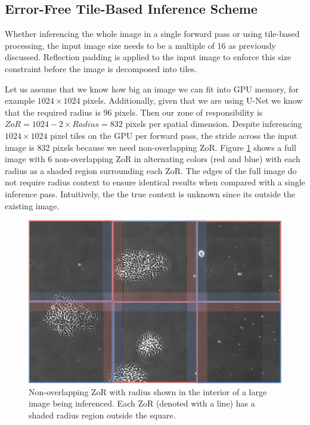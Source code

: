 \documentclass[letterpaper]{article} %
\begin{document}
\subsection{Error-Free Tile-Based Inference Scheme}

Whether inferencing the whole image in a single forward pass or using tile-based processing, the input image size needs to be a multiple of 16 as previously discussed. Reflection padding is applied to the input image to enforce this size constraint before the image is decomposed into tiles. 

Let us assume that we know how big an image we can fit into GPU memory, for example $1024 \times 1024$ pixels. Additionally, given that we are using U-Net we know that the required radius is 96 pixels. Then our zone of responsibility is $ZoR = 1024 - 2 \times Radius = 832$ pixels per spatial dimension. 
Despite inferencing $1024 \times 1024$ pixel tiles on the GPU per forward pass, the stride across the input image is 832 pixels because we need non-overlapping ZoR. Figure \ref{fig:all-zor} shows a full image with 6 non-overlapping ZoR in alternating colors (red and blue) with each radius as a shaded region surrounding each ZoR. The edges of the full image do not require radius context to ensure identical results when compared with a single inference pass. Intuitively, the the true context is unknown since its outside the existing image.

\begin{figure}[h!]
	\centering
		\includegraphics[width=\linewidth]{figs/all_zor.png}
	\caption{Non-overlapping ZoR with radius shown in the interior of a large image being inferenced. Each ZoR (denoted with a line) has a shaded radius region outside the square. }
	\label{fig:all-zor}
\end{figure}
\end{document}
